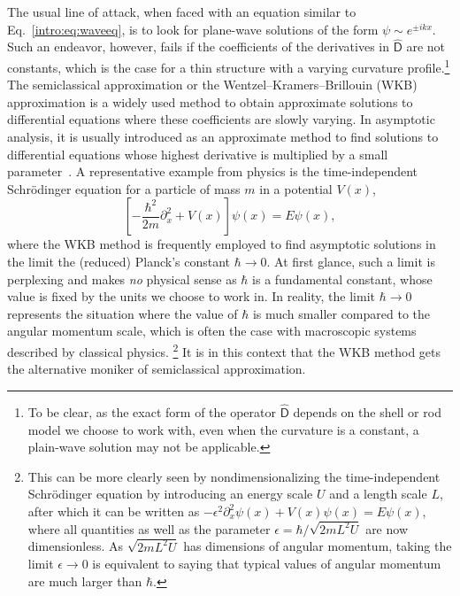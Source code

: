 The usual line of attack, when faced with an equation similar to Eq.~\eqref{intro:eq:waveeq}, is to look for plane-wave solutions of the form $\psi \sim e^{\pm i kx}$.
Such an endeavor, however, fails if the coefficients of the derivatives in $\widehat{\mathsf{D}}$ are not constants, which is the case for a thin structure with a varying curvature profile.\footnote{To be clear, as the exact form of the operator $\widehat{\mathsf{D}}$ depends on the shell or rod model we choose to work with, even when the curvature is a constant, a plain-wave solution may not be applicable.}
The semiclassical approximation or the Wentzel--Kramers--Brillouin (WKB) approximation is a widely used method to obtain approximate solutions to differential equations where these coefficients are slowly varying.
In asymptotic analysis, it is usually introduced as an approximate method to find solutions to differential equations whose highest derivative is multiplied by a small parameter~\cite{bender1978}.
A representative example from physics is the time-independent Schr\"{o}dinger equation for a particle of mass $m$ in a potential $V(x)$,
%
\begin{equation}
  \left[-\frac{\hbar^{2}}{2m}\partial_{x}^{2} + V(x)\right]\psi(x) = E\psi(x),
\end{equation}
%
where the WKB method is frequently employed to find asymptotic solutions in the limit the (reduced) Planck's constant $\hbar \to 0$.
At first glance, such a limit is perplexing and makes \emph{no} physical sense as $\hbar$ is a fundamental constant, whose value is fixed by the units we choose to work in.
In reality, the limit $\hbar \to 0$ represents the situation where the value of $\hbar$ is much smaller compared to the angular momentum scale, which is often the case with macroscopic systems described by classical physics.%
\footnote{%
  This can be more clearly seen by nondimensionalizing the time-independent Schr\"{o}dinger equation by introducing an energy scale $U$ and a length scale $L$, after which it can be written as
$-\epsilon^{2}\partial_{{x}}^{2}\psi(x) + {V}(x)\psi(x) = {E}\psi(x)$,
where all quantities as well as the parameter $\epsilon = \hbar/\sqrt{2mL^{2}U}$ are now dimensionless.
As $\sqrt{2mL^{2}U}$ has dimensions of angular momentum, taking the limit $\epsilon \to 0$ is equivalent to saying that typical values of angular momentum are much larger than $\hbar$.}
It is in this context that the WKB method gets the alternative moniker of semiclassical approximation.%

